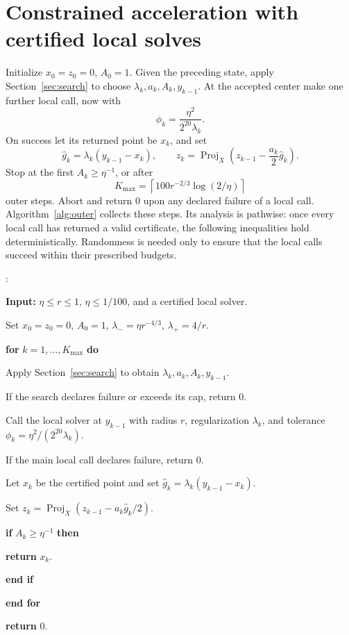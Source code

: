 \documentclass[11pt,a4paper]{article}
\newcounter{algline}
\newlength{\algindent}
\newenvironment{algorithmic}[1][]{%
  \setlength{\algindent}{0pt}\small
  \begin{list}{\arabic{algline}:}{\usecounter{algline}%
    \setlength{\leftmargin}{1.9em}\setlength{\labelsep}{0.5em}%
    \setlength{\itemsep}{2pt}\setlength{\parsep}{0pt}%
    \setlength{\topsep}{4pt}}}{\end{list}}
\newcommand{\State}{\item\hspace*{\algindent}}
\newcommand{\Require}{\item[]\textbf{Input:} }
\newcommand{\For}[1]{\State\textbf{for} #1 \textbf{do}\addtolength{\algindent}{1em}}
\newcommand{\EndFor}{\addtolength{\algindent}{-1em}\State\textbf{end for}}
\newcommand{\If}[1]{\State\textbf{if} #1 \textbf{then}\addtolength{\algindent}{1em}}
\newcommand{\EndIf}{\addtolength{\algindent}{-1em}\State\textbf{end if}}
\newcommand{\Return}{\textbf{return} }
\theoremstyle{definition}\newtheorem{definition}[theorem]{Definition}
\theoremstyle{remark}\newtheorem{remark}[theorem]{Remark}
\DeclareMathOperator{\proj}{Proj}
\begin{document}
\section{Constrained acceleration with certified local solves}\label{sec:outer}
\suppressfloats[t]
Initialize $x_0=z_0=0$, $A_0=1$. Given the preceding state, apply Section~\ref{sec:search} to choose $\lambda_k,a_k,A_k,y_{k-1}$. At the accepted center make one further local call, now with
\begin{equation}\label{eq:maintol}
 \phi_k=\frac{\eta^2}{2^{20}\lambda_k}.
\end{equation}
On success let its returned point be $x_k$, and set
\begin{equation}\label{eq:outerupdate}
 \widehat g_k=\lambda_k(y_{k-1}-x_k),\qquad
 z_k=\proj_X\left(z_{k-1}-\frac{a_k}{2}\widehat g_k\right).
\end{equation}
Stop at the first $A_k\ge\eta^{-1}$, or after
\begin{equation}\label{eq:K}
 K_{\max}=\left\lceil100r^{-2/3}\log(2/\eta)\right\rceil
\end{equation}
outer steps. Abort and return $0$ upon any declared failure of a local call. Algorithm~\ref{alg:outer} collects these steps. Its analysis is pathwise:
once every local call has returned a valid certificate, the following
inequalities hold deterministically. Randomness is needed only to ensure
that the local calls succeed within their prescribed budgets.


\begin{algorithm}[htbp]
\caption{Constrained accelerated outer method}\label{alg:outer}
\begin{algorithmic}[1]
\Require $\eta\le r\le1$, $\eta\le1/100$, and a certified local solver.
\State Set $x_0=z_0=0$, $A_0=1$, $\lambda_-=\eta r^{-4/3}$,
$\lambda_+=4/r$.
\For{$k=1,\ldots,K_{\max}$}
 \State Apply Section~\ref{sec:search} to obtain
 $\lambda_k,a_k,A_k,y_{k-1}$.
 \State If the search declares failure or exceeds its cap, return $0$.
 \State Call the local solver at $y_{k-1}$ with radius $r$,
 regularization $\lambda_k$, and tolerance
 $\phi_k=\eta^2/(2^{20}\lambda_k)$.
 \State If the main local call declares failure, return $0$.
 \State Let $x_k$ be the certified point and set
 $\widehat g_k=\lambda_k(y_{k-1}-x_k)$.
 \State Set $z_k=\proj_X(z_{k-1}-a_k\widehat g_k/2)$.
 \If{$A_k\ge\eta^{-1}$}
  \State \Return $x_k$.
 \EndIf
\EndFor
\State \Return $0$.
\end{algorithmic}
\end{algorithm}
\end{document}
